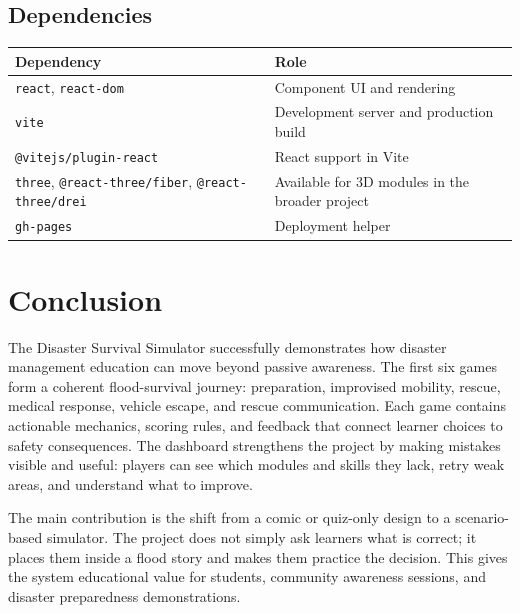 \documentclass[11pt,a4paper]{article}
\newcommand{\code}[1]{\texttt{#1}}
\newcommand{\sectionline}{\vspace{0.2em}{\color{ReportBlue}\hrule height 0.8pt}\vspace{0.6em}}
\begin{document}
\subsection{Dependencies}
\begin{table}[h]
\centering
\small
\begin{tabularx}{\textwidth}{L{0.34\textwidth}Y}
\toprule
\textbf{Dependency} & \textbf{Role} \\
\midrule
\code{react}, \code{react-dom} & Component UI and rendering \\
\code{vite} & Development server and production build \\
\code{@vitejs/plugin-react} & React support in Vite \\
\code{three}, \code{@react-three/fiber}, \code{@react-three/drei} & Available for 3D modules in the broader project \\
\code{gh-pages} & Deployment helper \\
\bottomrule
\end{tabularx}
\end{table}

\section{Conclusion}
\sectionline
The Disaster Survival Simulator successfully demonstrates how disaster management education can move beyond passive awareness. The first six games form a coherent flood-survival journey: preparation, improvised mobility, rescue, medical response, vehicle escape, and rescue communication. Each game contains actionable mechanics, scoring rules, and feedback that connect learner choices to safety consequences. The dashboard strengthens the project by making mistakes visible and useful: players can see which modules and skills they lack, retry weak areas, and understand what to improve.

The main contribution is the shift from a comic or quiz-only design to a scenario-based simulator. The project does not simply ask learners what is correct; it places them inside a flood story and makes them practice the decision. This gives the system educational value for students, community awareness sessions, and disaster preparedness demonstrations.
\end{document}
